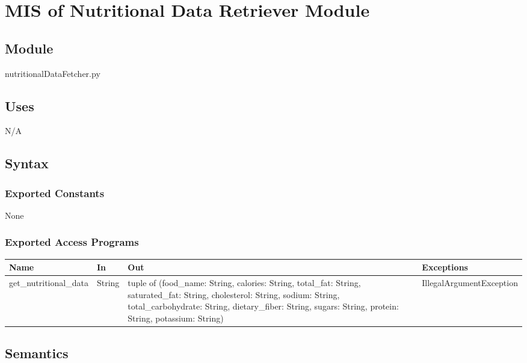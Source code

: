 \documentclass[12pt, titlepage]{article}
\begin{document}
\newpage

\section{MIS of Nutritional Data Retriever Module} \label{Module} 



\subsection{Module}

nutritionalDataFetcher.py

\subsection{Uses}
N/A

\subsection{Syntax}

\subsubsection{Exported Constants}
None

\subsubsection{Exported Access Programs}

\begin{center}
	\begin{tabular}{p{4cm} p{2cm} p{5cm} p{4.5cm}}
		\hline
		\textbf{Name} & \textbf{In} & \textbf{Out} & \textbf{Exceptions} \\
		\hline
		get\_nutritional\_data & String & tuple of (food\_name: String, calories: String, total\_fat: String, saturated\_fat: String, cholesterol: String, sodium: String, total\_carbohydrate: String, dietary\_fiber: String, sugars: String, protein: String, potassium: String) & IllegalArgumentException \\
		\hline
	\end{tabular}
\end{center}

\subsection{Semantics}
\end{document}

